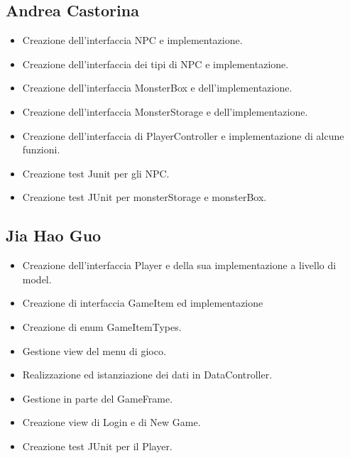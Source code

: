 \subsection*{Andrea Castorina}
\begin{itemize}
    \item Creazione dell'interfaccia NPC e implementazione.
    \item Creazione dell'interfaccia dei tipi di NPC e implementazione.
    \item Creazione dell'interfaccia MonsterBox e dell'implementazione.
    \item Creazione dell'interfaccia MonsterStorage e dell'implementazione.
    \item Creazione dell'interfaccia di PlayerController e implementazione di alcune funzioni.
    \item Creazione test Junit per gli NPC.
    \item Creazione test JUnit per monsterStorage e monsterBox.
\end{itemize}


\subsection*{Jia Hao Guo}
\begin{itemize}
    \item Creazione dell'interfaccia Player e della sua implementazione a livello di model.
    \item Creazione di interfaccia GameItem ed implementazione
    \item Creazione di enum GameItemTypes.
    \item Gestione view del menu di gioco.
    \item Realizzazione ed istanziazione dei dati in DataController.
    \item Gestione in parte del GameFrame.
    \item Creazione view di Login e di New Game.
    \item Creazione test JUnit per il Player.
\end{itemize}


